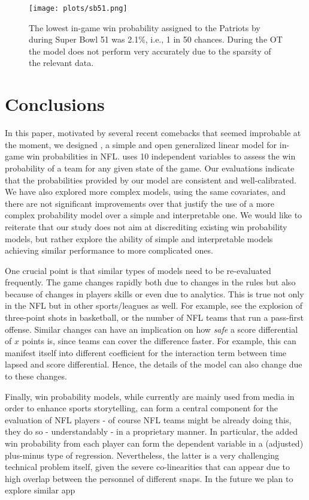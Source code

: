 \documentclass{sig-alternate}
\begin{document}
\begin{figure}[t]
\begin{center}
\texttt{[image: plots/sb51.png]}%
 \caption{The lowest in-game win probability assigned to the Patriots by {\method} during Super Bowl 51 was 2.1\%, i.e., 1 in 50 chances. During the OT the model does not perform very accurately due to the sparsity of the relevant data.}
 \label{fig:sb51}
\end{center}
\end{figure}

\section{Conclusions}
\label{sec:conclusions}

In this paper, motivated by several recent comebacks that seemed improbable at the moment, we designed {\method}, a simple and open generalized linear model for in-game win probabilities in NFL. 
{\method} uses 10 independent variables to assess the win probability of a team for any given state of the game. 
Our evaluations indicate that the probabilities provided by our model are consistent and well-calibrated. 
We have also explored more complex models, using the same covariates, and there are not significant improvements over {\method} that justify the use of a more complex probability model over a simple and interpretable one.  
We would like to reiterate that our study does not aim at discrediting existing win probability models, but rather explore the ability of simple and interpretable models achieving similar performance to more complicated ones. 
  
One crucial point is that similar types of models need to be re-evaluated frequently.  
The game changes rapidly both due to changes in the rules but also because of changes in players skills or even due to analytics.  
This is true not only in the NFL but in other sports/leagues as well.  
For example, see the explosion of three-point shots in basketball, or the number of NFL teams that run a pass-first offense. 
Similar changes can have an implication on how {\em safe} a score differential of $x$ points is, since teams can cover the difference faster.   
For example, this can manifest itself into different coefficient for the interaction term between time lapsed and score differential.  
Hence, the details of the model can also change due to these changes.  

Finally, win probability models, while currently are mainly used from media in order to enhance sports storytelling, can form a central component for the evaluation of NFL players - of course NFL teams might be already doing this, they do so - understandably - in a proprietary manner. 
In particular, the added win probability from each player can form the dependent variable in a (adjusted) plus-minus type of regression. 
Nevertheless, the latter is a very challenging technical problem itself, given the severe co-linearities that can appear due to high overlap between the personnel of different snaps. 
In the future we plan to explore similar app 
 
\end{document}
